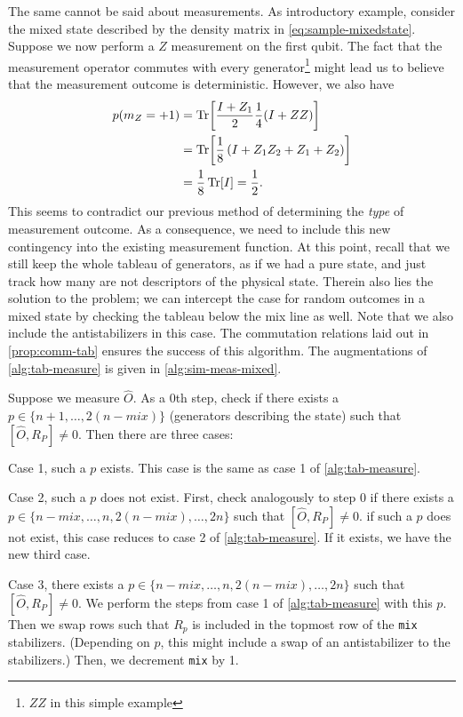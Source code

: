 The same cannot be said about measurements. As introductory example, consider
the mixed state described by the density matrix in \cref{eq:sample-mixedstate}.
Suppose we now perform a $Z$ measurement on the first qubit. The fact that the
measurement operator commutes with every generator\footnote{$ZZ$ in this simple
example} might lead us to believe that the measurement outcome is
deterministic. However, we also have
\begin{align}
  p(m_Z = +1) &= \Tr[\frac{I+Z_1}{2} \frac{1}{4} (I+ZZ)] \nonumber \\
              &= \Tr[\frac{1}{8}\left(I + Z_1Z_2 + Z_1 + Z_2  \right)] \nonumber \\
              &= \frac{1}{8} \Tr[I] = \frac{1}{2}
.\end{align}
This seems to contradict our previous method of determining the \emph{type} of
measurement outcome. As a consequence, we need to include this new contingency
into the existing measurement function. At this point, recall that we still
keep the whole tableau of generators, as if we had a pure state, and just track
how many are not descriptors of the physical state. Therein also lies the
solution to the problem; we can intercept the case for random outcomes in a
mixed state by checking the tableau below the mix line as well. Note that we
also include the antistabilizers in this case. The commutation relations laid
out in \cref{prop:comm-tab} ensures the success of this algorithm. The
augmentations of \cref{alg:tab-measure} is given in \cref{alg:sim-meas-mixed}.

\begin{alg}\label{alg:sim-meas-mixed}
  Suppose we measure $\hat{O}$. As a $0$th step, check if there exists a $p \in
  \{ n+1, \ldots, 2(n-mix) \}$ (generators describing the state) such that
  $[\hat{O}, R_P] \neq 0$. Then there are three cases:

  Case 1, such a $p$ exists. This case is the same as case 1 of
  \cref{alg:tab-measure}.

  Case 2, such a $p$ does not exist. First, check analogously to step $0$ if
  there exists a $p \in \{n-mix, \ldots, n, 2(n-mix), \ldots, 2n\}$ such that
  $[\hat{O}, R_P] \neq 0$. if such a $p$ does not exist, this case reduces to
  case 2 of \cref{alg:tab-measure}. If it exists, we have the new third case.

  Case 3, there exists a $p \in \{n-mix, \ldots, n, 2(n-mix), \ldots, 2n\}$
  such that $[\hat{O}, R_P] \neq 0$. We perform the steps from case 1 of
  \cref{alg:tab-measure} with this $p$. Then we swap rows such that $R_p$ is
  included in the topmost row of the \verb|mix| stabilizers. (Depending on $p$,
  this might include a swap of an antistabilizer to the stabilizers.) Then, we
  decrement \verb|mix| by 1.
\end{alg}
